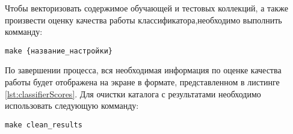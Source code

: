             \lstset{style=bash}
            

            Чтобы векторизовать содержимое обучающей и тестовых коллекций, а также
            произвести оценку качества работы классификатора,необходимо выполнить
            комманду:
            \begin{center}
                {\tt make {\{название\_настройки\}}}
            \end{center}

            По завершении процесса, вся необходимая информация по оценке качества
            работы будет отображена на экране в формате, представленном в листинге
            \ref{lst:classifierScores}.
            Для очистки каталога с результатами необходимо использовать следующую
            комманду:
            \begin{center}
                {\tt make clean\_results}
            \end{center}

%
%        
%
%
